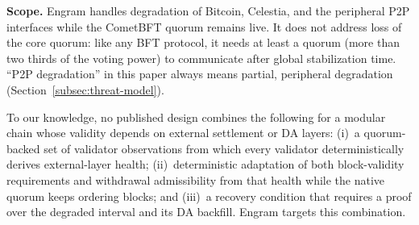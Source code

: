 \textbf{Scope.} Engram handles degradation of Bitcoin, Celestia, and the
peripheral P2P interfaces while the CometBFT quorum remains live. It does not
address loss of the core quorum: like any BFT protocol, it needs at least
a quorum (more than two thirds of the voting power) to communicate after global stabilization time.
``P2P degradation'' in this paper always means partial, peripheral degradation
(Section~\ref{subsec:threat-model}).

To our knowledge, no published design combines the following for a modular
chain whose validity depends on external settlement or DA layers:
(i)~a quorum-backed set of validator observations from which every validator
deterministically derives external-layer health; (ii)~deterministic adaptation
of both block-validity requirements and withdrawal admissibility from that
health while the native quorum keeps ordering blocks; and (iii)~a recovery
condition that requires a proof over the degraded interval and its DA backfill.
Engram targets this combination.

